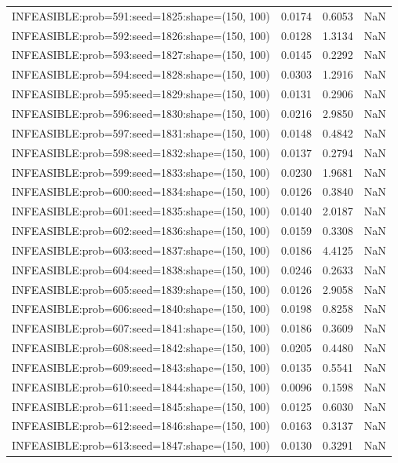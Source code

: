 \begin{longtable}{lccc}
INFEASIBLE:prob=591:seed=1825:shape=(150, 100) & 0.0174 &  0.6053 &    NaN \\
INFEASIBLE:prob=592:seed=1826:shape=(150, 100) & 0.0128 &  1.3134 &    NaN \\
INFEASIBLE:prob=593:seed=1827:shape=(150, 100) & 0.0145 &  0.2292 &    NaN \\
INFEASIBLE:prob=594:seed=1828:shape=(150, 100) & 0.0303 &  1.2916 &    NaN \\
INFEASIBLE:prob=595:seed=1829:shape=(150, 100) & 0.0131 &  0.2906 &    NaN \\
INFEASIBLE:prob=596:seed=1830:shape=(150, 100) & 0.0216 &  2.9850 &    NaN \\
INFEASIBLE:prob=597:seed=1831:shape=(150, 100) & 0.0148 &  0.4842 &    NaN \\
INFEASIBLE:prob=598:seed=1832:shape=(150, 100) & 0.0137 &  0.2794 &    NaN \\
INFEASIBLE:prob=599:seed=1833:shape=(150, 100) & 0.0230 &  1.9681 &    NaN \\
INFEASIBLE:prob=600:seed=1834:shape=(150, 100) & 0.0126 &  0.3840 &    NaN \\
INFEASIBLE:prob=601:seed=1835:shape=(150, 100) & 0.0140 &  2.0187 &    NaN \\
INFEASIBLE:prob=602:seed=1836:shape=(150, 100) & 0.0159 &  0.3308 &    NaN \\
INFEASIBLE:prob=603:seed=1837:shape=(150, 100) & 0.0186 &  4.4125 &    NaN \\
INFEASIBLE:prob=604:seed=1838:shape=(150, 100) & 0.0246 &  0.2633 &    NaN \\
INFEASIBLE:prob=605:seed=1839:shape=(150, 100) & 0.0126 &  2.9058 &    NaN \\
INFEASIBLE:prob=606:seed=1840:shape=(150, 100) & 0.0198 &  0.8258 &    NaN \\
INFEASIBLE:prob=607:seed=1841:shape=(150, 100) & 0.0186 &  0.3609 &    NaN \\
INFEASIBLE:prob=608:seed=1842:shape=(150, 100) & 0.0205 &  0.4480 &    NaN \\
INFEASIBLE:prob=609:seed=1843:shape=(150, 100) & 0.0135 &  0.5541 &    NaN \\
INFEASIBLE:prob=610:seed=1844:shape=(150, 100) & 0.0096 &  0.1598 &    NaN \\
INFEASIBLE:prob=611:seed=1845:shape=(150, 100) & 0.0125 &  0.6030 &    NaN \\
INFEASIBLE:prob=612:seed=1846:shape=(150, 100) & 0.0163 &  0.3137 &    NaN \\
INFEASIBLE:prob=613:seed=1847:shape=(150, 100) & 0.0130 &  0.3291 &    NaN \\

\end{longtable}
